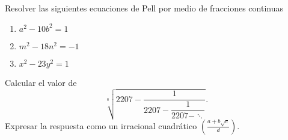 \begin{exercise}
    Resolver las siguientes ecuaciones de Pell por medio de fracciones continuas
    \begin{multicols}{3}
        \begin{enumerate}
            \item $a^2 - 10b^2 = 1$
            \item $m^2 - 18n^2 = -1$
            \item $x^2 - 23y^2 = 1$
        \end{enumerate}
    \end{multicols}
\end{exercise}


\begin{problem}
    Calcular el valor de
    \[
        \sqrt[\displaystyle 8\ ]{2207 - \dfrac{1}{2207 - \dfrac{1}{2207 - \ddots}}}.
    \]
    Expresar la respuesta como un irracional cuadrático $\left(\frac{a + b\sqrt{c}}{d}\right)$.
\end{problem}